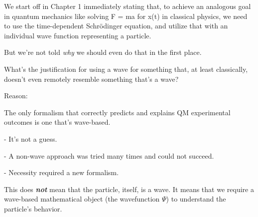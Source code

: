 We start off in Chapter 1 immediately stating that, to achieve an analogous
goal in quantum mechanics like solving F = ma for x(t) in classical physics,
we need to use the time-dependent Schrödinger equation, and utilize that with
an individual wave function representing a particle.

But we're not told \textit{why} we should even do that in the first place.

What's the justification for using a wave for something that,
at least classically, doesn't even remotely resemble something that's a wave?


Reason:

The only formalism that correctly predicts and explains QM experimental
outcomes is one that's wave-based.

- It's not a guess.

- A non-wave approach was tried many times and could not succeed.

- Necessity required a new formalism.

This does \textit{\textbf{not}} mean that the particle, itself, is a wave.
It means that we require a wave-based mathematical object
(the wavefunction $\Psi$) to understand the particle's behavior.
